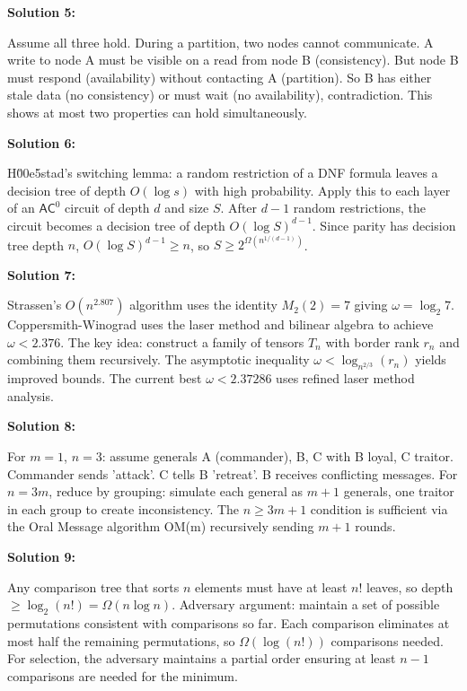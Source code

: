 \documentclass[12pt,a4paper]{exam}
\begin{document}
\vspace{0.5cm}

\textbf{Solution 5:}

Assume all three hold. During a partition, two nodes cannot communicate. A write to node A must be visible on a read from node B (consistency). But node B must respond (availability) without contacting A (partition). So B has either stale data (no consistency) or must wait (no availability), contradiction. This shows at most two properties can hold simultaneously.

\vspace{0.5cm}

\textbf{Solution 6:}

H\u00e5stad's switching lemma: a random restriction of a DNF formula leaves a decision tree of depth $O(\log s)$ with high probability. Apply this to each layer of an $\mathsf{AC}^0$ circuit of depth $d$ and size $S$. After $d-1$ random restrictions, the circuit becomes a decision tree of depth $O(\log S)^{d-1}$. Since parity has decision tree depth $n$, $O(\log S)^{d-1} \geq n$, so $S \geq 2^{\Omega(n^{1/(d-1)})}$.

\vspace{0.5cm}

\textbf{Solution 7:}

Strassen's $O(n^{2.807})$ algorithm uses the identity $M_2(2) = 7$ giving $\omega = \log_2 7$. Coppersmith-Winograd uses the laser method and bilinear algebra to achieve $\omega < 2.376$. The key idea: construct a family of tensors $T_n$ with border rank $r_n$ and combining them recursively. The asymptotic inequality $\omega < \log_{n^{2/3}}(r_n)$ yields improved bounds. The current best $\omega < 2.37286$ uses refined laser method analysis.

\vspace{0.5cm}

\textbf{Solution 8:}

For $m=1$, $n=3$: assume generals A (commander), B, C with B loyal, C traitor. Commander sends 'attack'. C tells B 'retreat'. B receives conflicting messages. For $n=3m$, reduce by grouping: simulate each general as $m+1$ generals, one traitor in each group to create inconsistency. The $n \geq 3m+1$ condition is sufficient via the Oral Message algorithm OM(m) recursively sending $m+1$ rounds.

\vspace{0.5cm}

\textbf{Solution 9:}

Any comparison tree that sorts $n$ elements must have at least $n!$ leaves, so depth $\geq \log_2(n!) = \Omega(n \log n)$. Adversary argument: maintain a set of possible permutations consistent with comparisons so far. Each comparison eliminates at most half the remaining permutations, so $\Omega(\log(n!))$ comparisons needed. For selection, the adversary maintains a partial order ensuring at least $n-1$ comparisons are needed for the minimum.
\end{document}
